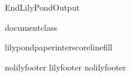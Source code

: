 
\def\ifundefined#1{\expandafter\ifx\csname#1\endcsname\relax}

%


\ifx\mustmakelilypondtitle\undefined\else\makelilypondtitle\fi
\ifx\mustmakelilypondpiecetitle\undefined\else\makelilypondpiecetitle\fi
%
\def\SkipLilydefs{\endinput}
\ifundefined{EndLilyPondOutput}
        \def\EndLilyPondOutput{\csname bye\endcsname}
        \def\SkipLilydefs{}
\fi
\SkipLilydefs

\ifundefined{documentclass}
        
\else
        
\fi

\def\botalign#1{\vbox to 0pt{\vss #1}}
\def\leftalign#1{\hbox to 0pt{#1\hss}}

\def\myfilbreak{\par\vfil\penalty200\vfilneg}


\ifundefined{lilypondpaperinterscorelinefill}
        \def\lilypondpaperinterscorelinefill{0}
\else
        \def\lilypondpaperinterscorelinefill{1}
\fi

\def\interscoreline{\vskip \lilypondpaperinterscoreline \lilypondpaperunit plus \lilypondpaperinterscorelinefill fill}

\def\placebox#1#2#3{%
        \botalign{\hbox{\raise #1\leftalign{\kern #2{}#3}}}}%

\ifx\pdfoutput\undefined  
  
\else
  \ifx\pdfoutput\relax
    
  \else
    
  \fi
\fi

\def\EndLilyPondOutput{%
 \vskip 0pt plus \lilypondpaperinterscorelinefill00 fill\csname bye\endcsname
}
\def\postheader{}


\ifx\csname nolilyfooter\endcsname\relax
        \csname lilyfooter\texsuffix\endcsname%
\else
        \csname%
        nolilyfooter\texsuffix\endcsname
\fi
\newdimen\outputscale
\endinput
